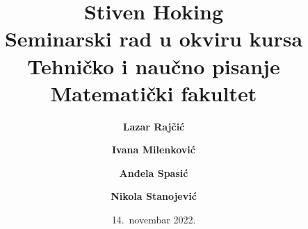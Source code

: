 \documentclass[a4paper, 12pt]{article}
\begin{document}
\title{\textbf{Stiven Hoking}\\ \small{Seminarski rad u okviru kursa\\Tehničko i naučno pisanje\\ Matematički fakultet}}

\author{
 \textbf {Lazar Rajčić}\\
  \and
  \textbf {Ivana Milenković}\\
  \and
 \textbf {Anđela Spasić}\\
  \and
 \textbf {Nikola Stanojević}\\
}
\date{14.~novembar 2022.}
\maketitle
\end{document}
